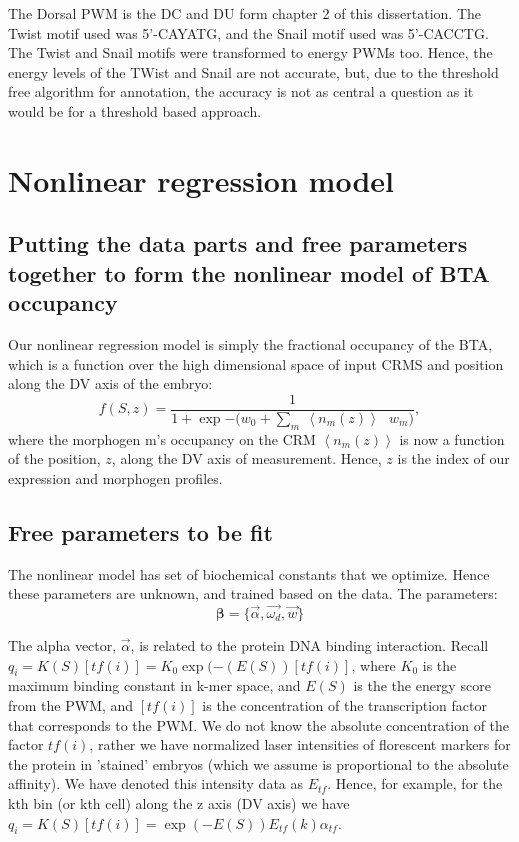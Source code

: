 The Dorsal PWM is the DC and DU form chapter 2 of this dissertation.  The Twist motif used was 5'-CAYATG, and the Snail motif used was 5'-CACCTG.  The Twist and Snail motifs were transformed to energy PWMs too.  Hence, the energy levels of the TWist and Snail are not accurate, but, due to the threshold free algorithm for annotation, the accuracy is not as central a question as it would be for a threshold based approach.

\section{Nonlinear regression model }
\subsection{Putting the data parts and free parameters together to form the nonlinear model of BTA occupancy }
Our nonlinear regression model is simply the fractional occupancy of the BTA, which is a function over the high dimensional space of input CRMS and position along the DV axis of the embryo:
\begin{equation}\label{modelz}
f( S,z ) =  \frac{1}{1 + \exp{ -(w_{0} + \sum_{m}  \  \left< n_m(z) \right> \ \ \ w_{m}})},
\end{equation}
where the morphogen m's occupancy on the CRM $\left< n_m(z) \right>$ is now a function of the position, $z$, along the DV axis of measurement.  Hence, $z$ is the index of our expression and morphogen profiles.
 


\subsection{Free parameters to be fit}
  
The nonlinear model has set of biochemical constants that we optimize.  Hence these parameters are unknown, and trained based on the data.  The parameters:
\begin{equation}\label{freeparams}
        \mathbf{\beta}=\{ \overrightarrow{\alpha},\overrightarrow{\omega_{ d}} ,\overrightarrow{w} \}
    \end{equation}
  
The alpha vector, $\overrightarrow{\alpha}$, is related to the protein DNA binding interaction.  Recall $q_i=K(S)[tf(i)] = K_0\exp{(-(E(S))}[tf(i)]$, where $K_0$ is the maximum binding constant in k-mer space, and $E(S)$ is the the energy score from the PWM, and $[tf(i)]$ is the concentration of the transcription factor that corresponds to the PWM.  We do not know the absolute concentration of the factor $tf(i)$, rather we have normalized laser intensities of florescent markers for the protein in 'stained' embryos (which we assume is proportional to the absolute affinity).  We have denoted this intensity data as $E_{tf}$.  Hence, for example, for the kth bin (or kth cell) along the z axis (DV axis) we have $q_i=K(S)[tf(i)] = \exp{(-E(S))}E_{tf}(k) \alpha_{tf}$.   

